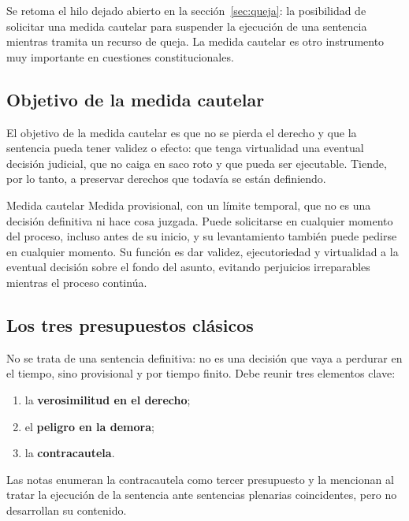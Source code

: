 \documentclass[12pt,oneside]{book}
\begin{document}
Se retoma el hilo dejado abierto en la sección~\ref{sec:queja}: la posibilidad de solicitar una medida cautelar para suspender la ejecución de una sentencia mientras tramita un recurso de queja. La medida cautelar es otro instrumento muy importante en cuestiones constitucionales.

\subsection{Objetivo de la medida cautelar}

El objetivo de la medida cautelar es que no se pierda el derecho y que la sentencia pueda tener validez o efecto: que tenga virtualidad una eventual decisión judicial, que no caiga en saco roto y que pueda ser ejecutable. Tiende, por lo tanto, a preservar derechos que todavía se están definiendo.

\begin{definition}{Medida cautelar}
Medida provisional, con un límite temporal, que no es una decisión definitiva ni hace cosa juzgada. Puede solicitarse en cualquier momento del proceso, incluso antes de su inicio, y su levantamiento también puede pedirse en cualquier momento. Su función es dar validez, ejecutoriedad y virtualidad a la eventual decisión sobre el fondo del asunto, evitando perjuicios irreparables mientras el proceso continúa.
\end{definition}

\subsection{Los tres presupuestos clásicos}

No se trata de una sentencia definitiva: no es una decisión que vaya a perdurar en el tiempo, sino provisional y por tiempo finito. Debe reunir tres elementos clave:

\begin{enumerate}
    \item la \textbf{verosimilitud en el derecho};
    \item el \textbf{peligro en la demora};
    \item la \textbf{contracautela}.
\end{enumerate}

\begin{note}
Las notas enumeran la contracautela como tercer presupuesto y la mencionan al tratar la ejecución de la sentencia ante sentencias plenarias coincidentes, pero no desarrollan su contenido.
\end{note}
\end{document}
